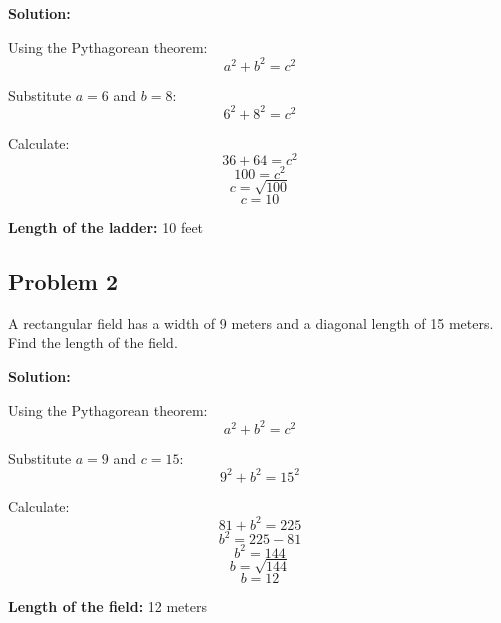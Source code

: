 \documentclass[12pt]{article}
\begin{document}
\textbf{Solution:}

Using the Pythagorean theorem:
\[
a^2 + b^2 = c^2
\]

Substitute \(a = 6\) and \(b = 8\):
\[
6^2 + 8^2 = c^2
\]

Calculate:
\[
36 + 64 = c^2
\]
\[
100 = c^2
\]
\[
c = \sqrt{100}
\]
\[
c = 10
\]

\textbf{Length of the ladder:} 10 feet

\newpage

\subsection*{Problem 2}

A rectangular field has a width of 9 meters and a diagonal length of 15 meters. Find the length of the field.

\textbf{Solution:}

Using the Pythagorean theorem:
\[
a^2 + b^2 = c^2
\]

Substitute \(a = 9\) and \(c = 15\):
\[
9^2 + b^2 = 15^2
\]

Calculate:
\[
81 + b^2 = 225
\]
\[
b^2 = 225 - 81
\]
\[
b^2 = 144
\]
\[
b = \sqrt{144}
\]
\[
b = 12
\]

\textbf{Length of the field:} 12 meters
\end{document}
